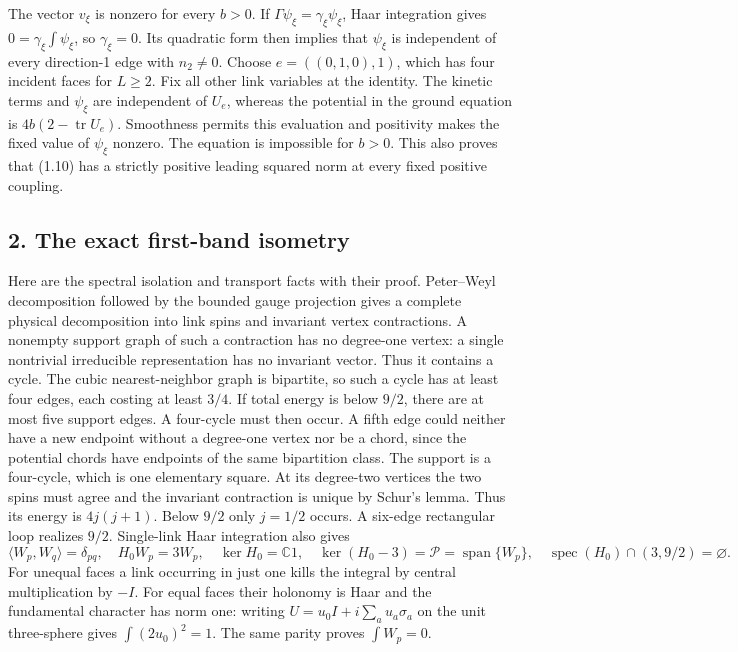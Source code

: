 \documentclass[
  11pt,
]{article}
\begin{document}
The vector \(v_\xi\) is nonzero for every \(b>0\). If
\(\Gamma\psi_\xi=\gamma_\xi\psi_\xi\), Haar integration gives
\(0=\gamma_\xi\int\psi_\xi\), so \(\gamma_\xi=0\). Its quadratic form
then implies that \(\psi_\xi\) is independent of every direction-1 edge
with \(n_2\ne0\). Choose \(e=((0,1,0),1)\), which has four incident
faces for \(L\ge2\). Fix all other link variables at the identity. The
kinetic terms and \(\psi_\xi\) are independent of \(U_e\), whereas the
potential in the ground equation is \(4b(2-\operatorname{tr}U_e)\).
Smoothness permits this evaluation and positivity makes the fixed value
of \(\psi_\xi\) nonzero. The equation is impossible for \(b>0\). This
also proves that (1.10) has a strictly positive leading squared norm at
every fixed positive coupling.

\subsection{2. The exact first-band
isometry}\label{magnetic-part-9-the-exact-first-band-isometry}

Here are the spectral isolation and transport facts with their proof.
Peter--Weyl decomposition followed by the bounded gauge projection gives
a complete physical decomposition into link spins and invariant vertex
contractions. A nonempty support graph of such a contraction has no
degree-one vertex: a single nontrivial irreducible representation has no
invariant vector. Thus it contains a cycle. The cubic nearest-neighbor
graph is bipartite, so such a cycle has at least four edges, each
costing at least \(3/4\). If total energy is below \(9/2\), there are at
most five support edges. A four-cycle must then occur. A fifth edge
could neither have a new endpoint without a degree-one vertex nor be a
chord, since the potential chords have endpoints of the same bipartition
class. The support is a four-cycle, which is one elementary square. At
its degree-two vertices the two spins must agree and the invariant
contraction is unique by Schur's lemma. Thus its energy is \(4j(j+1)\).
Below \(9/2\) only \(j=1/2\) occurs. A six-edge rectangular loop
realizes \(9/2\). Single-link Haar integration also gives \[
 \langle W_p,W_q\rangle=\delta_{pq},\quad
 H_0W_p=3W_p,\quad
 \ker H_0=\mathbb C1,\quad
 \ker(H_0-3)=\mathcal P=\operatorname{span}\{W_p\},
 \quad \operatorname{spec}(H_0)\cap(3,9/2)=\varnothing.
\tag{2.1}
\] For unequal faces a link occurring in just one kills the integral by
central multiplication by \(-I\). For equal faces their holonomy is Haar
and the fundamental character has norm one: writing
\(U=u_0I+i\sum_au_a\sigma_a\) on the unit three-sphere gives
\(\int(2u_0)^2=1\). The same parity proves \(\int W_p=0\).
\end{document}
